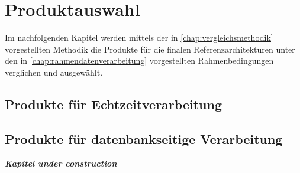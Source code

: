 \chapter{Produktauswahl}
Im nachfolgenden Kapitel werden mittels der in \autoref{chap:vergleichsmethodik} vorgestellten Methodik die Produkte für die finalen Referenzarchitekturen unter den in \autoref{chap:rahmendatenverarbeitung} vorgestellten Rahmenbedingungen verglichen und ausgewählt.

\section{Produkte für Echtzeitverarbeitung}\label{produkte:echtzeit}



\section{Produkte für datenbankseitige Verarbeitung}

\textbf{\textit{Kapitel under construction}} 

